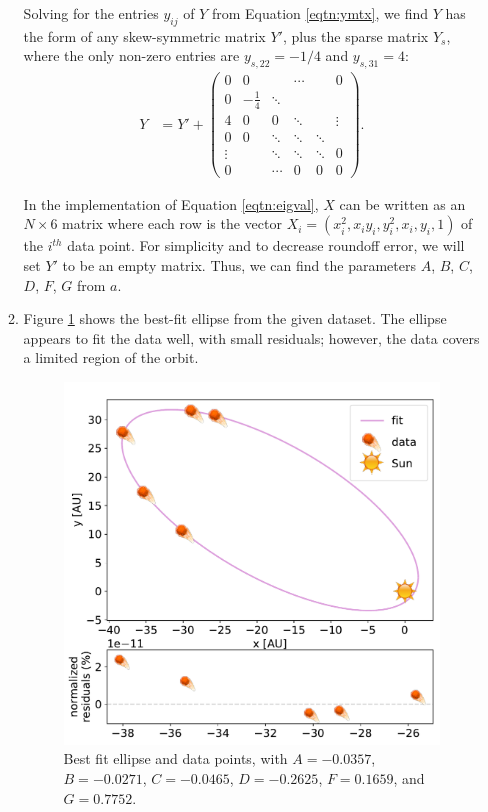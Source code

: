 \documentclass{article}
\begin{document}
\begin{enumerate}
\begin{enumerate}
        Solving for the entries $y_{ij}$ of $Y$ from Equation \ref{eqtn:ymtx}, we find $Y$ has the form of any skew-symmetric matrix $Y'$, plus the sparse matrix $Y_{s}$, where the only non-zero entries are $y_{s, 22}=-1/4$ and $y_{s,31}=4$:
        \begin{align}
            Y &= Y' +   \begin{pmatrix}
                0 & 0 &  & \cdots & & 0
                \\
                0 & -\frac{1}{4} & \ddots & & & 
                \\
                4 & 0 & 0 & \ddots & & \vdots
                \\
                0 & 0 & \ddots & \ddots & \ddots & 
                \\
                \vdots &  & \ddots &\ddots & \ddots  & 0
                \\
                0 &  & \cdots  & 0 & 0 & 0
              \end{pmatrix}.
        \end{align}

        In the implementation of Equation \ref{eqtn:eigval}, $X$ can be written as an $N\times 6$ matrix where each row is the vector $X_i = (x_i^2, x_iy_i, y_i^2, x_i, y_i, 1)$ of the $i^{th}$ data point. For simplicity and to decrease roundoff error, we will set $Y'$ to be an empty matrix. 
        Thus, we can find the parameters $A$, $B$, $C$, $D$, $F$, $G$ from $a$. 
    \item Figure \ref{fig:1a} shows the best-fit ellipse from the given dataset. The ellipse appears to fit the data well, with small residuals; however, the data covers a limited region of the orbit. 
    \begin{figure}[H]
        \centering 
        \captionsetup{margin=3.2cm}
        \includegraphics[width=0.5\linewidth]{Q1a.pdf}
        \caption{\label{fig:1a} Best fit ellipse and data points, with $A=-0.0357$, $B=-0.0271$, $C=-0.0465$, $D=-0.2625$, $F=0.1659$, and $G=0.7752$.}
    \end{figure}
\end{enumerate}


\end{enumerate}
\end{document}
